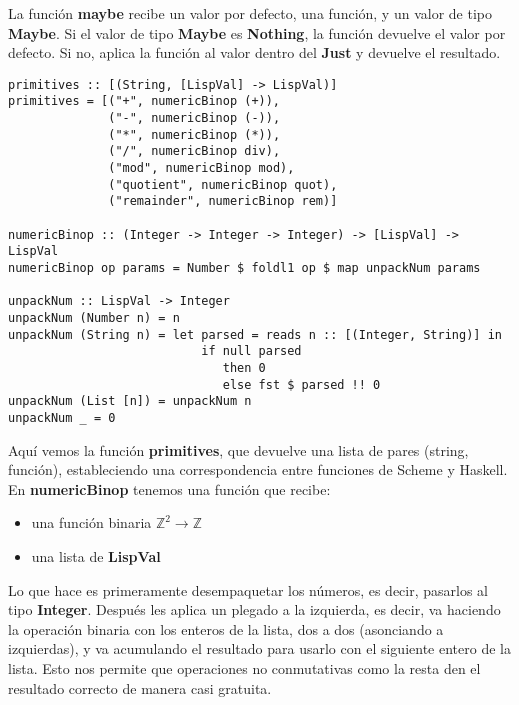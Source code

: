 La funci\'on \textbf{maybe} recibe un valor por defecto, una funci\'on, y un valor de tipo \textbf{Maybe}. Si el valor de tipo \textbf{Maybe} es \textbf{Nothing}, la funci\'on devuelve el valor por defecto. Si no, aplica la funci\'on al valor dentro del \textbf{Just} y devuelve el resultado.\\

\begin{minipage}{\linewidth}
\begin{footnotesize}
\begin{lstlisting}[frame=single]
primitives :: [(String, [LispVal] -> LispVal)]
primitives = [("+", numericBinop (+)),
              ("-", numericBinop (-)),
              ("*", numericBinop (*)),
              ("/", numericBinop div),
              ("mod", numericBinop mod),
              ("quotient", numericBinop quot),
              ("remainder", numericBinop rem)]

numericBinop :: (Integer -> Integer -> Integer) -> [LispVal] -> LispVal
numericBinop op params = Number $ foldl1 op $ map unpackNum params
 
unpackNum :: LispVal -> Integer
unpackNum (Number n) = n
unpackNum (String n) = let parsed = reads n :: [(Integer, String)] in 
                           if null parsed 
                              then 0
                              else fst $ parsed !! 0
unpackNum (List [n]) = unpackNum n
unpackNum _ = 0
\end{lstlisting}
\end{footnotesize}
\end{minipage}

Aqu\'i vemos la funci\'on \textbf{primitives}, que devuelve una lista de pares (string, funci\'on), estableciendo una correspondencia entre funciones de Scheme y Haskell. En \textbf{numericBinop} tenemos una funci\'on que recibe:

\begin{itemize}
  \item una funci\'on binaria $\mathbb{Z}^2 \rightarrow \mathbb{Z}$
  \item una lista de \textbf{LispVal}
\end{itemize}

Lo que hace es primeramente desempaquetar los n\'umeros, es decir, pasarlos al tipo \textbf{Integer}. Despu\'es les aplica un plegado a la izquierda, es decir, va haciendo la operaci\'on binaria con los enteros de la lista, dos a dos (asonciando a izquierdas), y va acumulando el resultado para usarlo con el siguiente entero de la lista. Esto nos permite que operaciones no conmutativas como la resta den el resultado correcto de manera casi gratuita.\\

